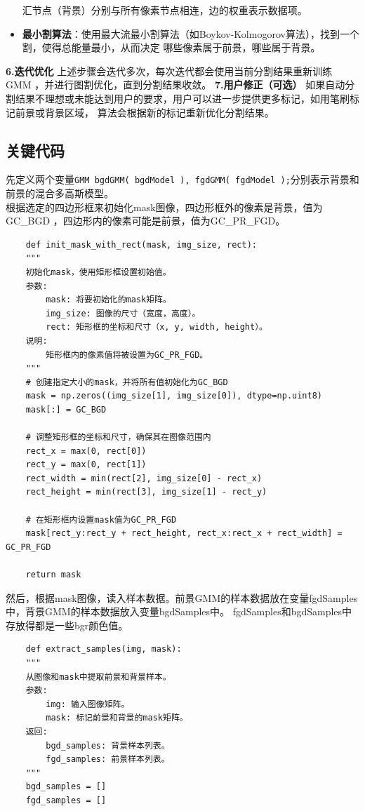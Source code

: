 \documentclass[12pt,a4paper]{article}
\begin{document}
\begin{CJK}{UTF8}{gbsn}
\begin{sloppypar}
\begin{itemize}
    汇节点（背景）分别与所有像素节点相连，边的权重表示数据项。
    \item \textbf{最小割算法}：使用最大流最小割算法（如Boykov-Kolmogorov算法），找到一个割，使得总能量最小，从而决定
    哪些像素属于前景，哪些属于背景。
\end{itemize}
\textbf{6.迭代优化}
上述步骤会迭代多次，每次迭代都会使用当前分割结果重新训练 GMM ，并进行图割优化，直到分割结果收敛。
\textbf{7.用户修正（可选）}
如果自动分割结果不理想或未能达到用户的要求，用户可以进一步提供更多标记，如用笔刷标记前景或背景区域，
算法会根据新的标记重新优化分割结果。

\subsection{关键代码}
先定义两个变量\verb|GMM bgdGMM( bgdModel ), fgdGMM( fgdModel );|分别表示背景和前景的混合多高斯模型。\\
根据选定的四边形框来初始化mask图像，四边形框外的像素是背景，值为GC\_BGD ，四边形内的像素可能是前景，值为GC\_PR\_FGD。
\begin{lstlisting}
    def init_mask_with_rect(mask, img_size, rect):
    """
    初始化mask，使用矩形框设置初始值。
    参数:
        mask: 将要初始化的mask矩阵。
        img_size: 图像的尺寸（宽度，高度）。
        rect: 矩形框的坐标和尺寸（x, y, width, height）。
    说明:
        矩形框内的像素值将被设置为GC_PR_FGD。
    """
    # 创建指定大小的mask，并将所有值初始化为GC_BGD
    mask = np.zeros((img_size[1], img_size[0]), dtype=np.uint8)
    mask[:] = GC_BGD

    # 调整矩形框的坐标和尺寸，确保其在图像范围内
    rect_x = max(0, rect[0])
    rect_y = max(0, rect[1])
    rect_width = min(rect[2], img_size[0] - rect_x)
    rect_height = min(rect[3], img_size[1] - rect_y)

    # 在矩形框内设置mask值为GC_PR_FGD
    mask[rect_y:rect_y + rect_height, rect_x:rect_x + rect_width] = GC_PR_FGD

    return mask
\end{lstlisting}
然后，根据mask图像，读入样本数据。前景GMM的样本数据放在变量fgdSamples中，背景GMM的样本数据放入变量bgdSamples中。
fgdSamples和bgdSamples中存放得都是一些bgr颜色值。
\begin{lstlisting}
    def extract_samples(img, mask):
    """
    从图像和mask中提取前景和背景样本。
    参数:
        img: 输入图像矩阵。
        mask: 标记前景和背景的mask矩阵。
    返回:
        bgd_samples: 背景样本列表。
        fgd_samples: 前景样本列表。
    """
    bgd_samples = []
    fgd_samples = []


\end{lstlisting}
\end{sloppypar}
\end{CJK}
\end{document}
